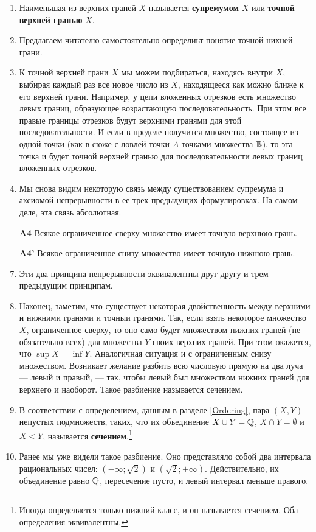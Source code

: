 \begin{enumerate}
\item Наименьшая из верхних граней $X$ называется \textbf{супремумом} $X$ или \textbf{точной верхней гранью} $X$.
\item Предлагаем читателю самостоятельно определиьт понятие точной нихней грани.
\item К точной верхней грани $X$ мы можем подбираться, находясь внутри $X$, выбирая каждый раз все новое число из $X$, находящееся как можно ближе к его верхней грани. Например, у цепи вложенных отрезков есть множество левых границ, образующее возрастающую последовательность. При этом все правые границы отрезков будут верхними гранями для этой последовательности. И если в пределе получится множество, состоящее из одной точки (как в сюже с ловлей точки $A$ точками множества $\mathbb B$), то эта точка и будет точной верхней гранью для последовательности левых границ вложенных отрезков.
\item Мы снова видим некоторую связь между существованием супремума и аксиомой непрерывности в ее трех предыдущих формулировках. На самом деле, эта связь абсолютная.
\item[\bf A4] Всякое ограниченное сверху множество имеет точную верхнюю грань.
\item[\bf A4'] Всякое ограниченное снизу множество имеет точную нижнюю грань.
\item Эти два принципа непрерывности эквивалентны друг другу и трем предыдущим принципам.
\item Наконец, заметим, что существует некоторая двойственность между верхними и нижними гранями и точныи гранями. Так, если взять некоторое множество $X$, ограниченное сверху, то оно само будет множеством нижних граней (не обязательно всех) для множества $Y$ своих верхних граней. При этом окажется, что $\sup X=\inf Y$. Аналогичная ситуация и с ограниченным снизу множеством. Возникает желание разбить всю числовую прямую на два луча --- левый и правый, --- так, чтобы левый был множеством нижних граней для верхнего и наоборот. Такое разбиение называется сечением.
\item В соответствии с определением, данным в разделе \ref{Ordering},
пара $(X,Y)$ непустых подмножеств, таких, что их объединение $X\cup Y=\mathbb Q$, $X\cap Y=\emptyset$ и $X<Y$, называется \textbf{сечением}.\footnote{Иногда определяется только нижний класс, и он называется сечением. Оба определения эквивалентны.}
\item Ранее мы уже видели такое разбиение. Оно представляло собой два интервала рациональных чисел: $(-\infty;\sqrt 2)$ и $(\sqrt 2;+\infty)$. Действительно, их объединение равно $\mathbb Q$, пересечение пусто, и левый интервал меньше правого.

\end{enumerate}
